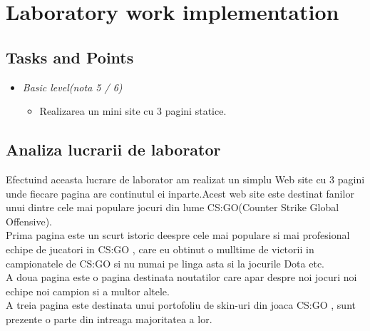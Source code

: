 \section{Laboratory work implementation}

\subsection{Tasks and Points}

\begin{center}
\begin{itemize}
\item \textit{Basic level(nota 5 / 6)}
\begin{itemize}
\item Realizarea un mini site cu 3 pagini statice.
\end{itemize}
\end{itemize}
\end{center}

\subsection{Analiza lucrarii de laborator}

Efectuind aceasta lucrare de laborator am realizat un simplu Web site cu 3 pagini unde fiecare pagina are continutul ei inparte.Acest web site este destinat fanilor unui dintre cele mai populare jocuri din lume CS:GO(Counter Strike Global Offensive).
\\
Prima pagina este un scurt istoric deespre cele mai populare si mai profesional echipe de jucatori in CS:GO , care eu obtinut o mulltime de victorii in campionatele de CS:GO si nu numai pe linga asta  si la jocurile Dota etc.
\\A doua pagina este o pagina destinata noutatilor care apar  despre noi jocuri noi echipe noi campion si a multor altele. \\
A treia pagina este destinata unui portofoliu de skin-uri din joaca CS:GO , sunt prezente o parte din intreaga majoritatea a lor.
